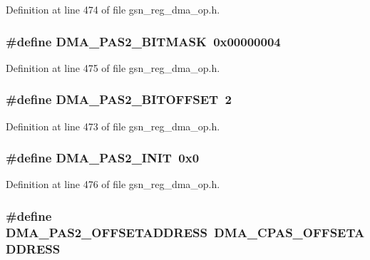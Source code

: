 Definition at line 474 of file gsn\_\-reg\_\-dma\_\-op.h.

\hypertarget{a00547_af8c4e3089e94a831564acfd1a85a95bb}{
\subsubsection[{DMA\_\-PAS2\_\-BITMASK}]{\setlength{\rightskip}{0pt plus 5cm}\#define DMA\_\-PAS2\_\-BITMASK~0x00000004}}
\label{a00547_af8c4e3089e94a831564acfd1a85a95bb}


Definition at line 475 of file gsn\_\-reg\_\-dma\_\-op.h.

\hypertarget{a00547_a94c7da41f0237a1fbbe4476d8f99c991}{
\subsubsection[{DMA\_\-PAS2\_\-BITOFFSET}]{\setlength{\rightskip}{0pt plus 5cm}\#define DMA\_\-PAS2\_\-BITOFFSET~2}}
\label{a00547_a94c7da41f0237a1fbbe4476d8f99c991}


Definition at line 473 of file gsn\_\-reg\_\-dma\_\-op.h.

\hypertarget{a00547_a2139cf00ca58fa907b6a254c2b662cb6}{
\subsubsection[{DMA\_\-PAS2\_\-INIT}]{\setlength{\rightskip}{0pt plus 5cm}\#define DMA\_\-PAS2\_\-INIT~0x0}}
\label{a00547_a2139cf00ca58fa907b6a254c2b662cb6}


Definition at line 476 of file gsn\_\-reg\_\-dma\_\-op.h.

\hypertarget{a00547_a36b6b7e7f9dd401f092a6910d5244091}{
\subsubsection[{DMA\_\-PAS2\_\-OFFSETADDRESS}]{\setlength{\rightskip}{0pt plus 5cm}\#define DMA\_\-PAS2\_\-OFFSETADDRESS~DMA\_\-CPAS\_\-OFFSETADDRESS}}
\label{a00547_a36b6b7e7f9dd401f092a6910d5244091}


